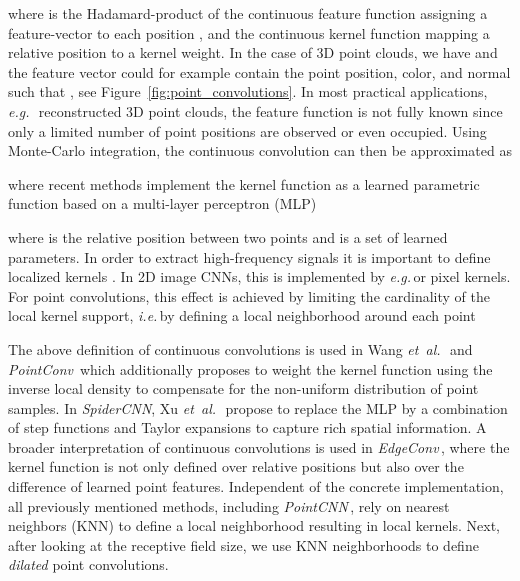 \documentclass[letterpaper, 10 pt, conference]{ieeeconf}
\def\eg{\emph{e.g.}\,}
\def\ie{\emph{i.e.}\,}
\def\etal{\emph{et~al.}\,}
\newcommand{\reffig}[1]{Figure~\ref{fig:#1}}
\begin{document}
where  is the Hadamard-product of the continuous feature function  assigning a feature-vector  to each position ,
and the continuous kernel function  mapping a relative position to a kernel weight.
In the case of 3D point clouds, we have  and the feature vector could for example contain the point position, color, and normal such that  , see \reffig{point_convolutions}.
In most practical applications, \eg~reconstructed 3D point clouds,  the feature function  is not fully known since only a limited number  of point positions  are observed or even occupied.
Using Monte-Carlo integration, the continuous convolution can then be approximated as

where recent methods implement the kernel function  as a learned parametric function based on a multi-layer perceptron (MLP)

where  is the relative position between two points and  is a set of learned parameters.
In order to extract high-frequency signals it is important to define localized kernels \cite{Zeiler18ECCV}.
In 2D image CNNs, this is implemented by \eg  or  pixel kernels.
For point convolutions, this effect is achieved by limiting the cardinality of the local kernel support, \ie by defining a local neighborhood  around each point 


The above definition of continuous convolutions is used in Wang \etal\,\cite{Wang18CVPRa} and 
\emph{PointConv}\,\cite{Wu18CVPR} which additionally proposes to weight the kernel function using the inverse local density to compensate for the non-uniform distribution of point samples.
In \emph{SpiderCNN}, Xu \etal \,\cite{Xu18ECCV} propose to replace the MLP by a combination of step functions and Taylor expansions to capture rich spatial information.
A broader interpretation of continuous convolutions is used in \emph{EdgeConv}\,\cite{Wang18CoRR}, where the kernel function  is not only defined over relative positions but also over the difference of learned point features.
Independent of the concrete implementation, all previously mentioned methods, including \emph{PointCNN}\,\cite{Li18NIPS}, rely on  nearest neighbors (KNN) to define a local neighborhood  resulting in local kernels.
Next, after looking at the receptive field size, we use KNN neighborhoods to define \emph{dilated} point convolutions.
\end{document}
